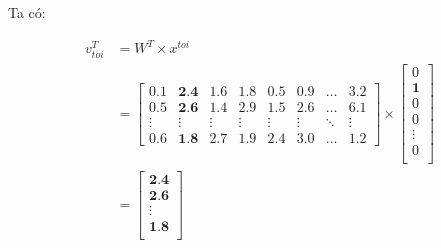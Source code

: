 Ta có:
\begin{center}
    \begin{equation}
    \begin{split}
        v^T_{toi} & = W^T\times x^{toi} \\
        & =
        \begin{bmatrix}
            0.1 & \textbf{2.4} & 1.6 & 1.8 & 0.5 & 0.9 & \dots & 3.2 \\
            0.5 & \textbf{2.6} & 1.4 & 2.9 & 1.5 & 2.6 & \dots & 6.1 \\
            \vdots & \vdots & \vdots & \vdots & \vdots & \vdots & \ddots & \vdots \\
            0.6 & \textbf{1.8} & 2.7 & 1.9 & 2.4 & 3.0 & \dots & 1.2
        \end{bmatrix} \times
        \begin{bmatrix}
            0\\
            \textbf{1} \\
            0 \\
            0 \\
            \vdots \\
            0 \\
        \end{bmatrix} \\
        & =
        \begin{bmatrix}
            \textbf{2.4} \\
            \textbf{2.6} \\
            \vdots \\
            \textbf{1.8} \\
        \end{bmatrix}
    \end{split}
    \end{equation}
\end{center}
\vspace{5mm} %
